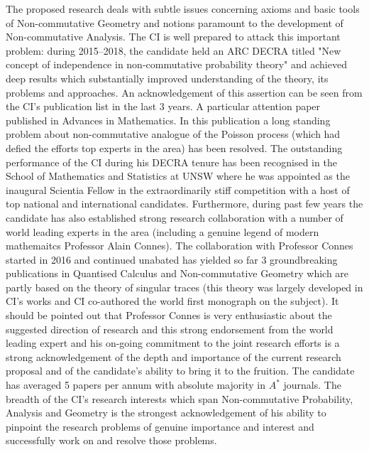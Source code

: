 \documentclass[12pt]{article}
\newcommand{\archeading}[1]{\vspace{.3cm} \noindent{\bfseries #1} \vspace{.1cm}   }
\begin{document}
\bigskip\archeading{Future Fellowship Candidate}

The proposed research deals with subtle issues concerning axioms and basic tools of Non-commutative Geometry and notions paramount to the development of Non-commutative Analysis. The CI is well prepared to attack this important problem: during 2015--2018, the candidate held an ARC DECRA titled "New concept of independence in non-commutative probability theory" and achieved deep results which substantially improved understanding of the theory, its problems and approaches. An acknowledgement of this assertion can be seen from the CI's publication list in the last 3 years. A particular attention paper \cite{JSZ_advances} published in Advances in Mathematics. In this publication a long standing problem about non-commutative analogue of the Poisson process (which had defied the efforts top experts in the area) has been resolved. {\color{blue}The outstanding performance of the CI during his DECRA tenure has been recognised in the School of Mathematics and Statistics at UNSW where he was appointed as the inaugural Scientia Fellow in the extraordinarily stiff competition with a host of top national and international candidates. Furthermore, during past few years } the candidate has also established strong research collaboration with a number of world leading experts in the area (including a genuine legend of modern mathemaitcs Professor Alain Connes). The collaboration with Professor Connes {\color{blue}started in 2016 and continued unabated has yielded so far 3 groundbreaking publications in Quantised Calculus and Non-commutative Geometry \cite{Connes_team,Connes_team_symmetric} which are partly based} on the theory of singular traces (this theory was largely developed in CI's works and CI co-authored the world first monograph \cite{book} on the subject). It should be pointed out that Professor Connes is very enthusiastic about the suggested direction of research and this strong endorsement from the world leading expert and his on-going commitment to the joint research efforts is a strong acknowledgement of the {\color{blue} depth and importance of the current research proposal and of the candidate's ability to bring it to the fruition. The candidate has averaged 5 papers per annum with absolute majority in $A^{\ast}$ journals. The breadth of the CI's research interests which span Non-commutative Probability, Analysis and Geometry is the strongest acknowledgement of his ability to pinpoint the research problems of genuine importance and interest and successfully work on and resolve those problems.} 
\end{document}
